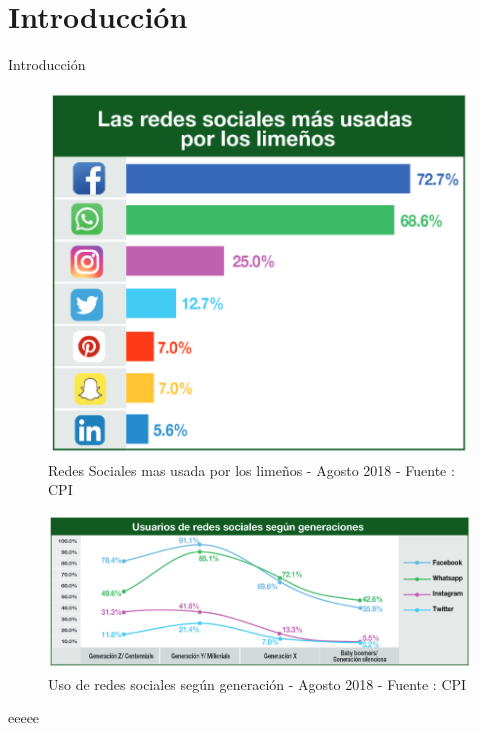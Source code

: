 \chapter{Introducci\'on}
\label{intro}

Introducci\'on 

\begin{figure}
\centering
\includegraphics[scale=0.7]{chapters/img/Ch01_UsoRedesSocialesLima.PNG}
\caption{Redes Sociales mas usada por los lime\~nos - Agosto 2018 - Fuente : CPI}
\end{figure}

\begin{figure}
\centering
\includegraphics[scale=0.5]{chapters/img/Ch01_UsoRedesSocialesGeneracion.PNG}
\caption{Uso de redes sociales seg\'un generaci\'on - Agosto 2018 - Fuente : CPI}
\end{figure}

eeeee
\cleardoublepage